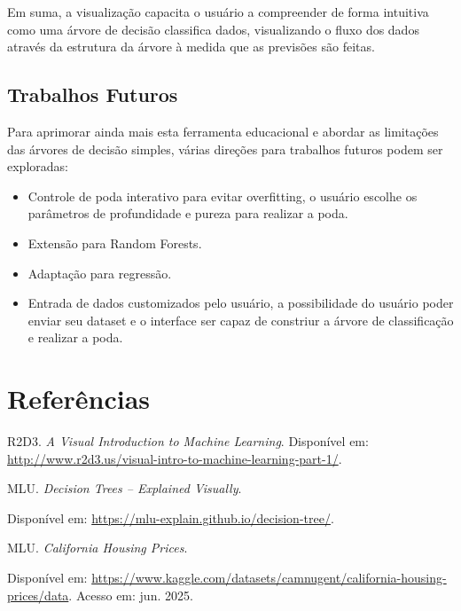 \documentclass{article}
\begin{document}
Em suma, a visualização capacita o usuário a compreender de forma intuitiva como uma árvore de decisão classifica dados, 
visualizando o fluxo dos dados através da estrutura da árvore à medida que as previsões são feitas. 

\subsection*{Trabalhos Futuros}
Para aprimorar ainda mais esta ferramenta educacional e abordar as limitações das árvores de decisão simples, 
várias direções para trabalhos futuros podem ser exploradas:

\begin{itemize}
    \item Controle de poda interativo para evitar overfitting, o usuário escolhe os parâmetros de profundidade e pureza para realizar a poda.
    \item Extensão para Random Forests.
    \item Adaptação para regressão.
    \item Entrada de dados customizados pelo usuário, a possibilidade do usuário poder enviar seu dataset e o interface ser capaz de  constriur a árvore de classificação e realizar a poda.
\end{itemize}

\section{Referências}
\begin{thebibliography}{9}

R2D3. 
\textit{A Visual Introduction to Machine Learning}.  
Disponível em: \url{http://www.r2d3.us/visual-intro-to-machine-learning-part-1/}. 

MLU. 
\textit{Decision Trees – Explained Visually}.

Disponível em: \url{https://mlu-explain.github.io/decision-tree/}. 

MLU. 
\textit{California Housing Prices}.

Disponível em: \url{https://www.kaggle.com/datasets/camnugent/california-housing-prices/data}. 
Acesso em: jun. 2025.

\end{thebibliography}
\end{document}
